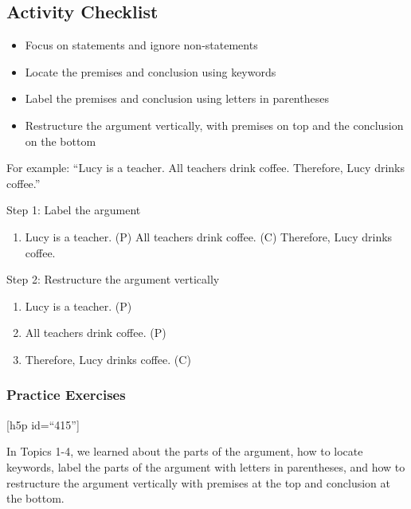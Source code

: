 \documentclass[
]{book}
\providecommand{\tightlist}{%
  \setlength{\itemsep}{0pt}\setlength{\parskip}{0pt}}
\begin{document}
\hypertarget{activity-checklist-1}{%
\subsection*{Activity Checklist}\label{activity-checklist-1}}

\begin{itemize}
\tightlist
\item
  Focus on statements and ignore non-statements
\item
  Locate the premises and conclusion using keywords
\item
  Label the premises and conclusion using letters in parentheses
\item
  Restructure the argument vertically, with premises on top and the conclusion on the bottom
\end{itemize}

For example:
``Lucy is a teacher. All teachers drink coffee. Therefore, Lucy drinks coffee.''

Step 1: Label the argument

\begin{enumerate}
\def\labelenumi{(\Alph{enumi})}
\setcounter{enumi}{15}
\tightlist
\item
  Lucy is a teacher. (P) All teachers drink coffee. (C) Therefore, Lucy drinks coffee.
\end{enumerate}

Step 2: Restructure the argument vertically

\begin{enumerate}
\def\labelenumi{\arabic{enumi}.}
\tightlist
\item
  Lucy is a teacher. (P)
\item
  All teachers drink coffee. (P)
\item
  Therefore, Lucy drinks coffee. (C)
\end{enumerate}

\hypertarget{practice-exercises}{%
\subsubsection*{Practice Exercises}\label{practice-exercises}}

{[}h5p id=``415''{]}

In Topics 1-4, we learned about the parts of the argument, how to locate keywords, label the parts of the argument with letters in parentheses, and how to restructure the argument vertically with premises at the top and conclusion at the bottom.
\end{document}
